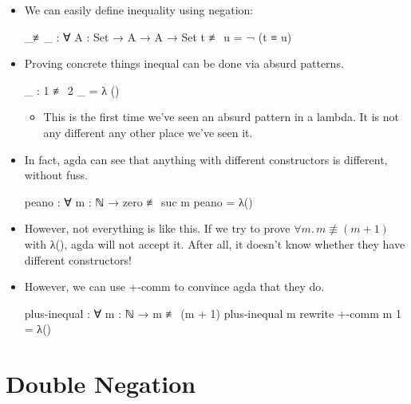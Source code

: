 \documentclass{lecturenotes}
\begin{document}
\begin{itemize}
\item We can easily define inequality using negation:
\begin{code}
_≢_ : ∀ {A : Set} → A → A → Set
t ≢ u = ¬ (t ≡ u)    
\end{code}
\item Proving concrete things inequal can be done via absurd patterns.
\begin{code}
_ : 1 ≢ 2
_ = λ ()    
\end{code}
\begin{itemize}
\item This is the first time we've seen an absurd pattern in a lambda.
  It is not any different any other place we've seen it.
\end{itemize}
\item In fact, agda can see that anything with different constructors is different, without fuss.
\begin{code}
peano : ∀ {m : ℕ} → zero ≢ suc m
peano = λ()    
\end{code}
\item However, not everything is like this.
  If we try to prove $\forall m.\,m \not\equiv (m + 1)$ with \textsf{λ()}, agda will not accept it.
  After all, it doesn't know whether they have different constructors!
\item However, we can use +-comm to convince agda that they do.
\begin{code}
plus-inequal : ∀ {m : ℕ} → m ≢ (m + 1)
plus-inequal {m} rewrite +-comm m 1 = λ()    
\end{code}
\end{itemize}

\pagebreak
\section{Double Negation}
\label{sec:double-negation}
\end{document}
